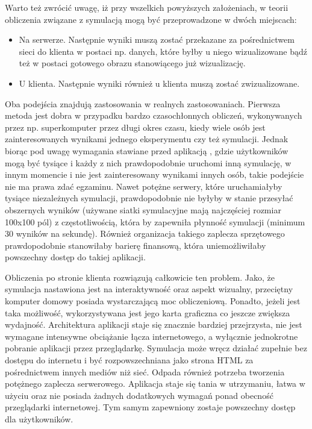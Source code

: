 Warto też zwrócić uwagę, iż przy wszelkich powyższych założeniach, w teorii
obliczenia związane z symulacją mogą być przeprowadzone w dwóch miejscach:

\begin{itemize} 

\item Na serwerze. Następnie wyniki muszą zostać przekazane za pośrednictwem
sieci do klienta w postaci np. danych, które byłby u niego wizualizowane bądź
też w postaci gotowego obrazu stanowiącego już wizualizację.

\item U klienta. Następnie wyniki również u klienta muszą zostać zwizualizowane.

\end{itemize}

Oba podejścia znajdują zastosowania w realnych zastosowaniach. Pierwsza metoda
jest dobra w przypadku bardzo czasochłonnych obliczeń, wykonywanych przez np.
superkomputer przez długi okres czasu, kiedy wiele osób jest zainteresowanych
wynikami jednego eksperymentu czy też symulacji. Jednak biorąc pod uwagę
wymagania stawiane przed aplikacją \en, gdzie użytkowników mogą być tysiące i
każdy z nich prawdopodobnie uruchomi inną symulację, w innym momencie i nie jest
zainteresowany wynikami innych osób, takie podejście nie ma prawa zdać egzaminu.
Nawet potężne serwery, które uruchamiałyby tysiące niezależnych symulacji,
prawdopodobnie nie byłyby w stanie przesyłać obszernych wyników (używane siatki
symulacyjne mają najczęściej rozmiar 100x100 pól) z częstotliwością, która by
zapewniła płynność symulacji (minimum 30 wyników na sekundę). Również
organizacja takiego zaplecza sprzętowego prawdopodobnie stanowiłaby barierę
finansową, która uniemożliwiłaby powszechny dostęp do takiej aplikacji.

Obliczenia po stronie klienta rozwiązują całkowicie ten problem. Jako, że
symulacja nastawiona jest na interaktywność oraz aspekt wizualny, przeciętny
komputer domowy posiada wystarczającą moc obliczeniową. Ponadto, jeżeli jest
taka możliwość, wykorzystywana jest jego karta graficzna co jeszcze zwiększa
wydajność. Architektura aplikacji staje się znacznie bardziej przejrzysta, nie
jest wymagane intensywne obciążanie łącza internetowego, a wyłącznie jednokrotne
pobranie aplikacji przez przeglądarkę. Symulacja może wręcz działać zupełnie bez
dostępu do internetu i być rozpowszechniana jako strona HTML za pośrednictwem
innych mediów niż sieć. Odpada również potrzeba tworzenia potężnego zaplecza
serwerowego. Aplikacja staje się tania w utrzymaniu, łatwa w użyciu oraz nie
posiada żadnych dodatkowych wymagań ponad obecność przeglądarki internetowej.
Tym samym zapewniony zostaje powszechny dostęp dla użytkowników.

